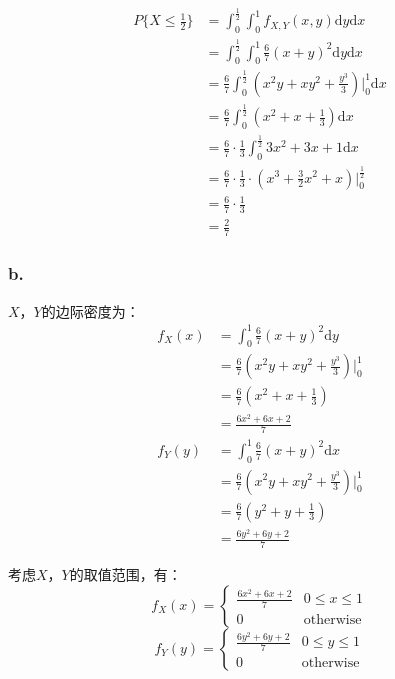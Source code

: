 \documentclass[a4paper,12pt]{ctexart}
\begin{document}
\begin{align*}
	P\{X \leq \frac{1}{2}\} &= \int_0^{\frac{1}{2}} \int_0^1 f_{X,Y}(x,y) \mathrm{d}y \mathrm{d}x \\
	&= \int_0^{\frac{1}{2}} \int_0^1 \frac{6}{7} (x + y)^2 \mathrm{d}y \mathrm{d}x \\
	&= \frac{6}{7} \int_0^{\frac{1}{2}} \left( x^2y + xy^2 + \frac{y^3}{3} \right) \Big|_0^1 \mathrm{d}x \\
	&= \frac{6}{7} \int_0^{\frac{1}{2}} \left( x^2 + x + \frac{1}{3} \right) \mathrm{d}x \\
	&= \frac{6}{7} \cdot \frac{1}{3} \int_0^{\frac{1}{2}} 3x^2 + 3x + 1 \mathrm{d}x \\
	&= \frac{6}{7} \cdot \frac{1}{3} \cdot \left( x^3 + \frac{3}{2}x^2 + x \right) \Big|_0^{\frac{1}{2}} \\
	&= \frac{6}{7} \cdot \frac{1}{3} \\
	&= \frac{2}{7}
\end{align*}

\subsubsection*{b.}

$X$，$Y$的边际密度为：
\begin{align*}
	f_X(x) &= \int_0^1 \frac{6}{7} (x + y)^2 \mathrm{d}y \\
	&= \frac{6}{7} \left( x^2y + xy^2 + \frac{y^3}{3} \right) \Big|_0^1 \\
	&= \frac{6}{7} \left( x^2 + x + \frac{1}{3} \right) \\
	&= \frac{6x^2 + 6x + 2}{7} \\
	f_Y(y) &= \int_0^1 \frac{6}{7} (x + y)^2 \mathrm{d}x \\
	&= \frac{6}{7} \left( x^2y + xy^2 + \frac{y^3}{3} \right) \Big|_0^1 \\
	&= \frac{6}{7} \left( y^2 + y + \frac{1}{3} \right) \\
	&= \frac{6y^2 + 6y + 2}{7}
\end{align*}

考虑$X$，$Y$的取值范围，有：
\begin{equation*}
	f_X(x) = 
	\begin{cases}
		\frac{6x^2 + 6x + 2}{7} & 0 \leq x \leq 1 \\
		0 & \text{otherwise}
	\end{cases}
\end{equation*}
\begin{equation*}
	f_Y(y) = 
	\begin{cases}
		\frac{6y^2 + 6y + 2}{7} & 0 \leq y \leq 1 \\
		0 & \text{otherwise}
	\end{cases}
\end{equation*}
\end{document}
